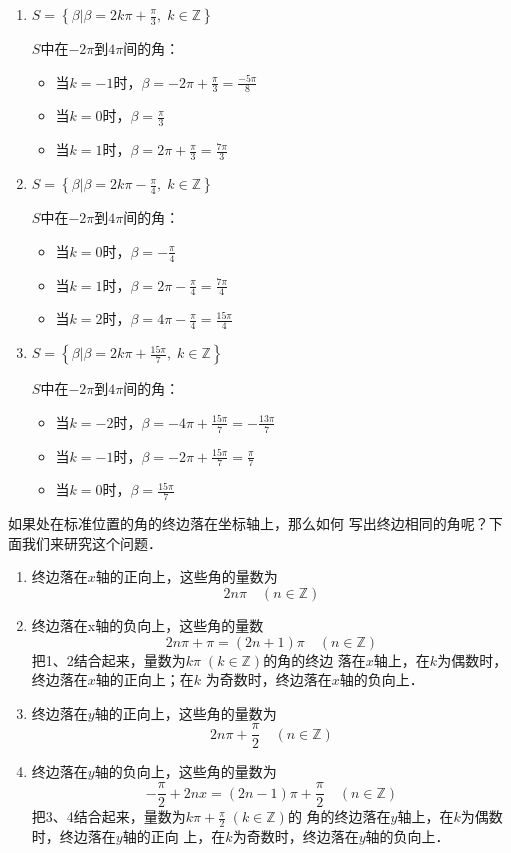 \begin{solution}
\begin{enumerate}
    \item 
$S=\left\{\beta \Big|\beta =2k\pi+\frac{\pi}{3},\; k\in\mathbb{Z}\right\}$

$S$中在$-2\pi$到$4\pi$间的角：
\begin{itemize}
    \item 当$k=-1$时，$\beta =-2\pi+\frac{\pi}{3}=\frac{-5\pi}{8}$
    \item 当$k=0$时，$\beta=\frac{\pi}{3}$ 
    \item 当$k=1$时，$\beta =2\pi+\frac{\pi}{3}=\frac{7\pi}{3}$
\end{itemize}

\item $S=\left\{\beta \Big|\beta =2k\pi-\frac{\pi}{4},\;k\in\mathbb{Z}\right\}$

$S$中在$-2\pi$到$4\pi$间的角：
\begin{itemize}
    \item 当$k=0$时，$\beta =-\frac{\pi}{4}$
    \item 当$k=1$时，$\beta =2\pi-\frac{\pi}{4}=\frac{7\pi}{4}$
    \item 当$k=2$时，$\beta =4\pi-\frac{\pi}{4}=\frac{15\pi}{4}$
\end{itemize}

\item $S=\left\{\beta \Big|\beta =2k\pi+\frac{15\pi}{7},\; k\in\mathbb{Z}\right\}$

$S$中在$-2\pi$到$4\pi$间的角：
\begin{itemize}
    \item 当$k=-2$时，$\beta =-4\pi+\frac{15\pi}{7}=-\frac{13\pi}{7}$
    \item 当$k=-1$时，$\beta =-2\pi+\frac{15\pi}{7}=\frac{\pi}{7}$
    \item 当$k=0$时，$\beta=\frac{15\pi}{7}$
\end{itemize}
\end{enumerate}    
\end{solution}

如果处在标准位置的角的终边落在坐标轴上，那么如何
写出终边相同的角呢？下面我们来研究这个问题．

\begin{enumerate}
    \item 终边落在$x$轴的正向上，这些角的量数为
\[2n\pi\quad  (n\in\mathbb{Z})\]
\item 终边落在x轴的负向上，这些角的量数
\[2n\pi +\pi =(2n+1)\pi\quad  (n\in\mathbb{Z})\]
把1、2结合起来，量数为$k\pi\;  (k\in\mathbb{Z})$的角的终边
落在$x$轴上，在$k$为偶数时，终边落在$x$轴的正向上；在$k$
为奇数时，终边落在$x$轴的负向上．
\item 终边落在$y$轴的正向上，这些角的量数为
\[2n\pi +\frac{\pi}{2}\quad (n\in\mathbb{Z})\]
\item 终边落在$y$轴的负向上，这些角的量数为
\[-\frac{\pi}{2}+2nx=(2n-1)\pi +\frac{\pi}{2}\quad (n\in\mathbb{Z})\]
把3、4结合起来，量数为$k\pi +\frac{\pi}{2}\; (k\in\mathbb{Z})$的
角的终边落在$y$轴上，在$k$为偶数时，终边落在$y$轴的正向
上，在$k$为奇数时，终边落在$y$轴的负向上．
\end{enumerate}

